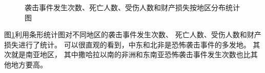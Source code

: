 \documentclass[bwprint]{gmcmthesis}
\begin{document}
\begin{figure}[htbp]
    \caption{袭击事件发生次数、死亡人数、受伤人数和财产损失按地区分布统计图}
    \label{tab:地区分布}
\end{figure}

图\ref{tab:地区分布}利用条形统计图对不同地区的袭击事件发生次数、
死亡人数、受伤人数和财产损失进行了统计。
可以很直观的看到，中东和北非是恐怖袭击事件的多发地。
其次就是南亚地区，
其中撒哈拉以南的非洲和东南亚恐怖袭击事件发生次数也比其他地方要高。
\end{document}
